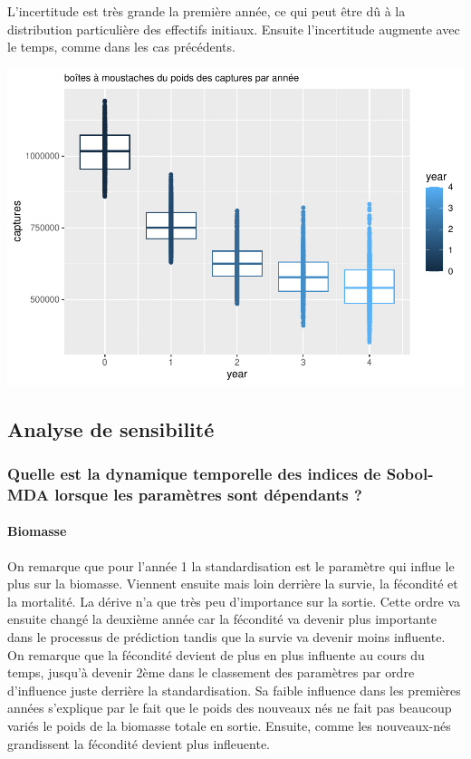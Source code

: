 \documentclass[
]{article}
\begin{document}
L'incertitude est très grande la première année, ce qui peut être dû à
la distribution particulière des effectifs initiaux. Ensuite
l'incertitude augmente avec le temps, comme dans les cas précédents.

\includegraphics{rapport_files/figure-latex/auxxs-1.pdf}

\hypertarget{analyse-de-sensibilituxe9}{%
\subsection{Analyse de sensibilité}\label{analyse-de-sensibilituxe9}}

\hypertarget{quelle-est-la-dynamique-temporelle-des-indices-de-sobol-mda-lorsque-les-paramuxe8tres-sont-duxe9pendants}{%
\subsubsection{Quelle est la dynamique temporelle des indices de
Sobol-MDA lorsque les paramètres sont dépendants
?}\label{quelle-est-la-dynamique-temporelle-des-indices-de-sobol-mda-lorsque-les-paramuxe8tres-sont-duxe9pendants}}

\hypertarget{biomasse-7}{%
\paragraph{Biomasse}\label{biomasse-7}}

On remarque que pour l'année 1 la standardisation est le paramètre qui
influe le plus sur la biomasse. Viennent ensuite mais loin derrière la
survie, la fécondité et la mortalité. La dérive n'a que très peu
d'importance sur la sortie. Cette ordre va ensuite changé la deuxième
année car la fécondité va devenir plus importante dans le processus de
prédiction tandis que la survie va devenir moins influente. On remarque
que la fécondité devient de plus en plus influente au cours du temps,
jusqu'à devenir 2ème dans le classement des paramètres par ordre
d'influence juste derrière la standardisation. Sa faible influence dans
les premières années s'explique par le fait que le poids des nouveaux
nés ne fait pas beaucoup variés le poids de la biomasse totale en
sortie. Ensuite, comme les nouveaux-nés grandissent la fécondité devient
plus infleuente.
\end{document}
